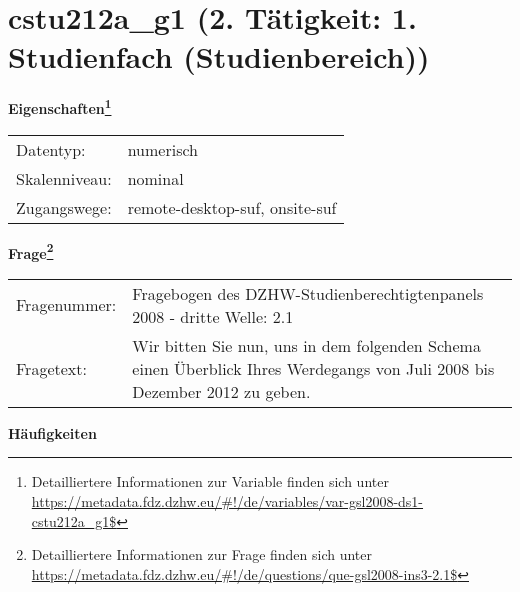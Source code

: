 
    \setcounter{footnote}{0}

    \vspace*{-1.8cm}
	\section{cstu212a\_g1 (2. Tätigkeit: 1. Studienfach (Studienbereich))}
	\label{section:cstu212a_g1}



    \vspace*{0.5cm}
    \noindent\textbf{Eigenschaften\footnote{Detailliertere Informationen zur Variable finden sich unter
		\url{https://metadata.fdz.dzhw.eu/\#!/de/variables/var-gsl2008-ds1-cstu212a_g1$}}}\\
	\begin{tabularx}{\hsize}{@{}lX}
	Datentyp: & numerisch \\
	Skalenniveau: & nominal \\
	Zugangswege: &
	  remote-desktop-suf, 
	  onsite-suf
 \\
    \end{tabularx}



				\vspace*{0.5cm}
                \noindent\textbf{Frage\footnote{Detailliertere Informationen zur Frage finden sich unter
		              \url{https://metadata.fdz.dzhw.eu/\#!/de/questions/que-gsl2008-ins3-2.1$}}}\\
				\begin{tabularx}{\hsize}{@{}lX}
					Fragenummer: &
					  Fragebogen des DZHW-Studienberechtigtenpanels 2008 - dritte Welle:
					  2.1
 \\
					Fragetext: & Wir bitten Sie nun, uns in dem folgenden Schema einen Überblick Ihres Werdegangs von Juli 2008 bis Dezember 2012 zu geben. \\
				\end{tabularx}





        		\vspace*{0.5cm}
                \noindent\textbf{Häufigkeiten}

